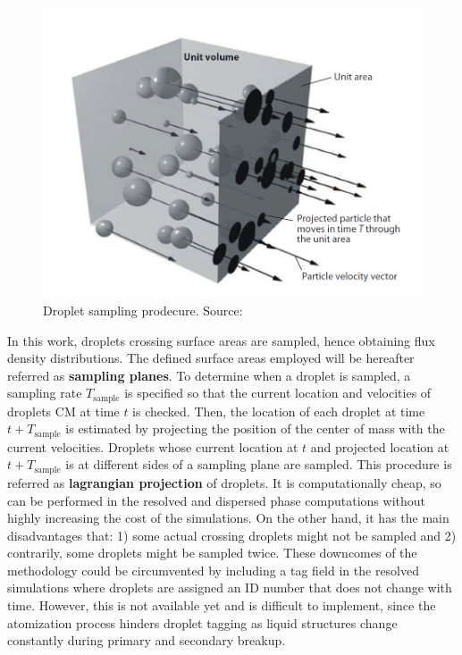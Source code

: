 \begin{figure}[h!]
	\centering
	\includegraphics[scale=0.6]{./part2_developments/figures_ch4_SLI/tropea_droplet_sampling}
	\caption{Droplet sampling prodecure. Source: }
	\label{fig:tropea_droplet_sampling}
\end{figure}

In this work, droplets crossing surface areas are sampled, hence obtaining flux density distributions. The defined surface areas employed will be hereafter referred as \textbf{sampling planes}. To determine when a droplet is sampled, a sampling rate $T_\mathrm{sample}$ is specified so that the current location and velocities of droplets CM at time $t$ is checked. Then, the location of each droplet at time $t + T_\mathrm{sample}$ is estimated by projecting the position of the center of mass with the current velocities. Droplets whose current location at $t$ and projected location at $t + T_\mathrm{sample}$ is at different sides of a sampling plane are sampled. This procedure is referred as \textbf{lagrangian projection} of droplets. It is computationally cheap, so can be performed in the resolved and dispersed phase computations without highly increasing the cost of the simulations. On the other hand, it has the main disadvantages that: 1) some actual crossing droplets might not be sampled and 2) contrarily, some droplets might be sampled twice. These downcomes of the methodology could be circumvented by including a tag field in the resolved simulations where droplets are assigned an ID number that does not change with time. However, this is not available yet and is difficult to implement, since the atomization process hinders droplet tagging as liquid structures change constantly during primary and secondary breakup.

